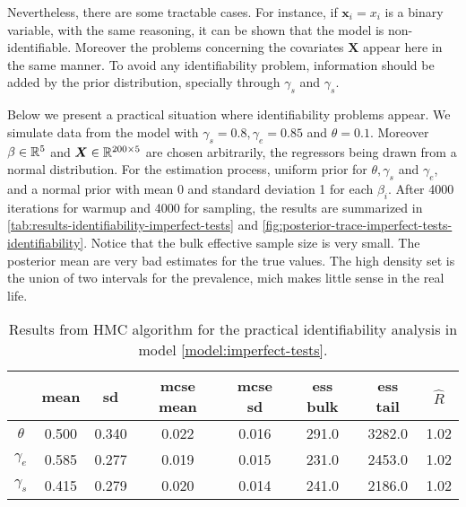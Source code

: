 Nevertheless, there are some tractable cases. For instance, if $\boldsymbol{x}_i = x_i$ is a binary variable, with the same
reasoning, it can be shown that the model is non-identifiable. Moreover the
problems concerning the covariates $\boldsymbol{X}$ appear here in the same
manner. To avoid any identifiability problem, information should be added by
the prior distribution, specially through $\gamma_s$ and $\gamma_s$.

Below we present a practical situation where identifiability problems appear.
We simulate data from the model with $\gamma_s = 0.8, \gamma_e = 0.85$ and
$\theta = 0.1$. Moreover $\beta \in \mathbb{R}^5$ and $\boldsymbol{X} \in \mathbb{R}^{200
    \times 5}$ are chosen arbitrarily, the regressors being drawn from a normal
distribution. For the estimation process, uniform prior for $\theta, \gamma_s$
and $\gamma_e$, and a normal prior with mean 0 and standard deviation 1 for
each $\beta_i$. After 4000 iterations for warmup and 4000 for sampling, the
results are summarized in
\autoref{tab:results-identifiability-imperfect-tests}
and \autoref{fig:posterior-trace-imperfect-tests-identifiability}. Notice that
the bulk effective sample size is very small. The posterior mean are
very bad estimates for the true values. The high density set is the
union of two intervals for the prevalence, mich makes little sense in the real
life.

\begin{table}[tbp]
  \centering
  \caption{\label{tab:results-identifiability-imperfect-tests}Results from HMC
    algorithm for the practical identifiability analysis in model \eqref{model:imperfect-tests}.}
  \begin{tabular}{cccccccc}
    \hline
    \textbf{}        & \textbf{mean}     & \textbf{sd}       & \textbf{mcse mean} &
    \textbf{mcse sd} & \textbf{ess bulk} & \textbf{ess tail} &
    \textbf{$\hat{R}$}                                                                                            \\ \hline
    $\theta$         & 0.500             & 0.340             & 0.022              & 0.016 & 291.0 & 3282.0 & 1.02 \\
    $\gamma_e$       & 0.585             & 0.277             & 0.019              & 0.015 & 231.0 & 2453.0 & 1.02 \\
    $\gamma_s$       & 0.415             & 0.279             & 0.020              & 0.014 & 241.0 & 2186.0 & 1.02 \\ \hline
  \end{tabular}
\end{table}

